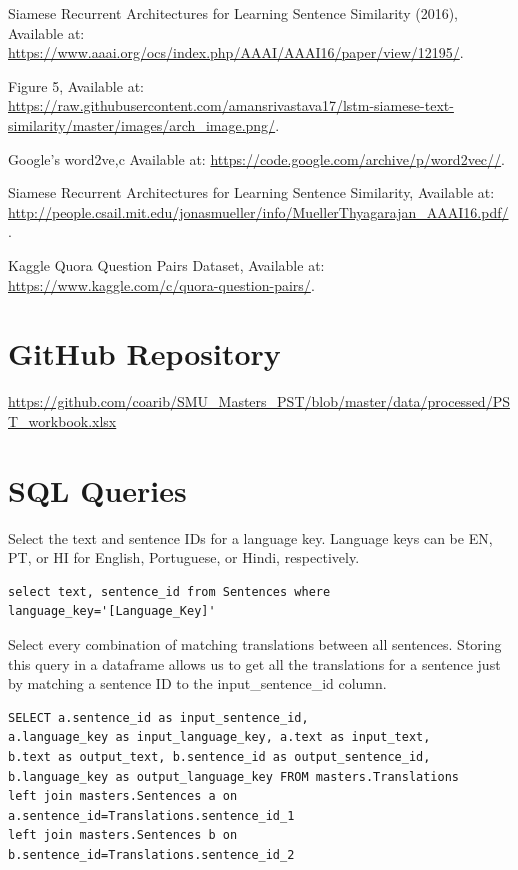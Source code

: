 \documentclass[runningheads]{llncs}
\begin{document}
\begin{thebibliography}{8}
Siamese Recurrent Architectures for Learning Sentence Similarity (2016), Available at:
\url{https://www.aaai.org/ocs/index.php/AAAI/AAAI16/paper/view/12195/}.

Figure 5, Available at: \url{https://raw.githubusercontent.com/amansrivastava17/lstm-siamese-text-similarity/master/images/arch_image.png/}.

Google's word2ve,c Available at:
\url{https://code.google.com/archive/p/word2vec//}.

Siamese Recurrent Architectures for Learning Sentence Similarity, Available at:
\url{http://people.csail.mit.edu/jonasmueller/info/MuellerThyagarajan_AAAI16.pdf/}.

Kaggle Quora Question Pairs  Dataset, Available at: 
\url{https://www.kaggle.com/c/quora-question-pairs/}.


\end{thebibliography}


\appendix

\section{GitHub Repository}
	\url{https://github.com/coarib/SMU_Masters_PST/blob/master/data/processed/PST_workbook.xlsx}

\section{SQL Queries}
Select the text and sentence IDs for a language key. Language keys can be EN, PT, or HI for English, Portuguese, or Hindi, respectively. 

\begin{verbatim}
select text, sentence_id from Sentences where language_key='[Language_Key]'
\end{verbatim}
Select every combination of matching translations between all sentences. Storing this query in a dataframe allows us to get all the translations for a sentence just by matching a sentence ID to the input\_sentence\_id column.

\begin{verbatim}
SELECT a.sentence_id as input_sentence_id, 
a.language_key as input_language_key, a.text as input_text, 
b.text as output_text, b.sentence_id as output_sentence_id, 
b.language_key as output_language_key FROM masters.Translations 
left join masters.Sentences a on a.sentence_id=Translations.sentence_id_1 
left join masters.Sentences b on b.sentence_id=Translations.sentence_id_2
\end{verbatim}
\end{document}
